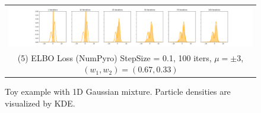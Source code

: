 \begin{figure}[!htbp]
    
    \begin{tabular}{@{}c@{}}
        \includegraphics[width=\toyfigwidth]{figs/toy-figure1-numpyro.png} \\
        \small (5) ELBO Loss (NumPyro) StepSize = 0.1, 100 iters, $\mu = \pm 3$, $(w_1, w_2) = (0.67, 0.33)$
    \end{tabular}
     
    \caption{Toy example with 1D Gaussian mixture. Particle densities are visualized by KDE.}
    \label{fig:toy1dgaussian}
\end{figure}
